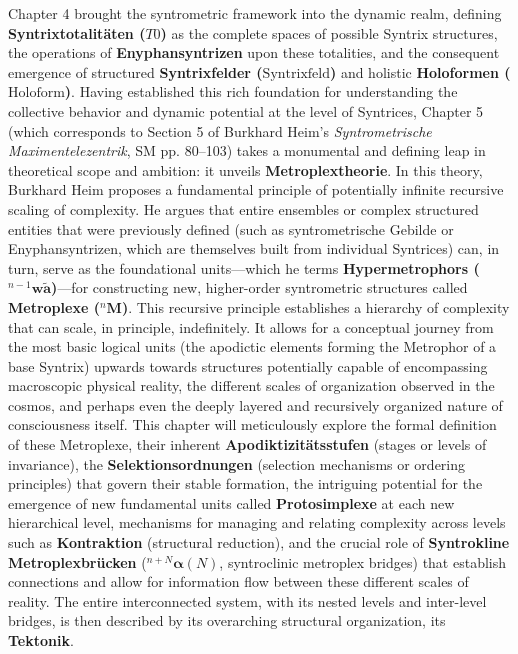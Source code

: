 \documentclass[12pt]{article}
\newcommand{\syntrixtotalitaet}{T0}
\newcommand{\syntrixfeld}{\text{Syntrixfeld}}
\newcommand{\holoform}{\text{Holoform}}
\newcommand{\metroplex}[1]{{}^{#1}\mathbf{M}}
\newcommand{\hypermetrophor}[1]{{}^{#1}\mathbf{w\widetilde{a}}}
\newcommand{\syntroklinebruecke}[1]{{}^{#1}\bm{\alpha}}
\begin{document}
Chapter 4 brought the syntrometric framework into the dynamic realm, defining \textbf{Syntrixtotalitäten (\(\syntrixtotalitaet\))} as the complete spaces of possible Syntrix structures, the operations of \textbf{Enyphansyntrizen} upon these totalities, and the consequent emergence of structured \textbf{Syntrixfelder (\(\syntrixfeld\))} and holistic \textbf{Holoformen (\(\holoform\))}. Having established this rich foundation for understanding the collective behavior and dynamic potential at the level of Syntrices, Chapter 5 (which corresponds to Section 5 of Burkhard Heim's \textit{Syntrometrische Maximentelezentrik}, SM pp. 80–103) takes a monumental and defining leap in theoretical scope and ambition: it unveils \textbf{Metroplextheorie}. In this theory, Burkhard Heim proposes a fundamental principle of potentially infinite recursive scaling of complexity. He argues that entire ensembles or complex structured entities that were previously defined (such as syntrometrische Gebilde or Enyphansyntrizen, which are themselves built from individual Syntrices) can, in turn, serve as the foundational units—which he terms \textbf{Hypermetrophors (\(\hypermetrophor{n-1}\))}—for constructing new, higher-order syntrometric structures called \textbf{Metroplexe (\(\metroplex{n}\))}. This recursive principle establishes a hierarchy of complexity that can scale, in principle, indefinitely. It allows for a conceptual journey from the most basic logical units (the apodictic elements forming the Metrophor of a base Syntrix) upwards towards structures potentially capable of encompassing macroscopic physical reality, the different scales of organization observed in the cosmos, and perhaps even the deeply layered and recursively organized nature of consciousness itself. This chapter will meticulously explore the formal definition of these Metroplexe, their inherent \textbf{Apodiktizitätsstufen} (stages or levels of invariance), the \textbf{Selektionsordnungen} (selection mechanisms or ordering principles) that govern their stable formation, the intriguing potential for the emergence of new fundamental units called \textbf{Protosimplexe} at each new hierarchical level, mechanisms for managing and relating complexity across levels such as \textbf{Kontraktion} (structural reduction), and the crucial role of \textbf{Syntrokline Metroplexbrücken} (\(\syntroklinebruecke{n+N}(N)\), syntroclinic metroplex bridges) that establish connections and allow for information flow between these different scales of reality. The entire interconnected system, with its nested levels and inter-level bridges, is then described by its overarching structural organization, its \textbf{Tektonik}.
\end{document}
